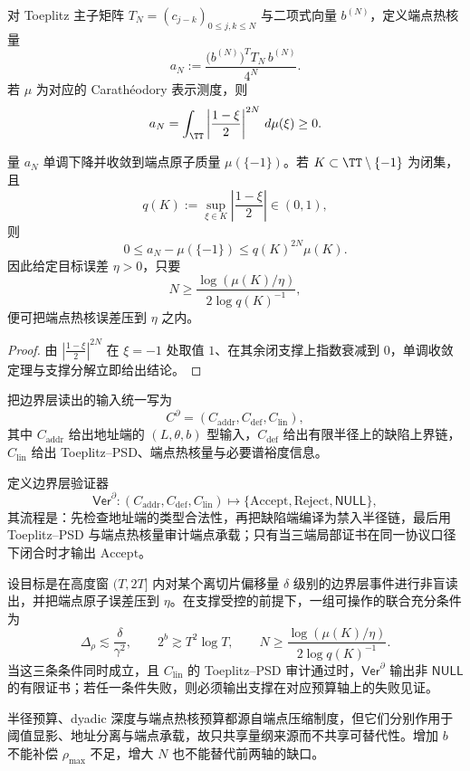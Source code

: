 \begin{definition}[端点热核量]\label{def:unit-circle-boundary-endpoint-heat}
对 Toeplitz 主子矩阵 \(T_N=(c_{j-k})_{0\le j,k\le N}\) 与二项式向量 \(b^{(N)}\)，定义端点热核量
\[
a_N:=\frac{\bigl(b^{(N)}\bigr)^{\!T}T_N\,b^{(N)}}{4^N}.
\]
若 \(\mu\) 为对应的 Carath\'eodory 表示测度，则
\[
a_N=\int_{\TT}\left|\frac{1-\xi}{2}\right|^{2N}\,d\mu(\xi)\ge 0.
\]
\end{definition}

\begin{proposition}[端点热核的单调极限]\label{prop:unit-circle-boundary-endpoint-heat-decay}
量 \(a_N\) 单调下降并收敛到端点原子质量 \(\mu(\{-1\})\)。若 \(K\subset\TT\setminus\{-1\}\) 为闭集，且
\[
q(K):=\sup_{\xi\in K}\left|\frac{1-\xi}{2}\right|\in(0,1),
\]
则
\[
0\le a_N-\mu(\{-1\})\le q(K)^{2N}\mu(K).
\]
因此给定目标误差 \(\eta>0\)，只要
\[
N\ge \frac{\log(\mu(K)/\eta)}{2\log q(K)^{-1}},
\]
便可把端点热核误差压到 \(\eta\) 之内。
\end{proposition}
\begin{proof}
由 \(\left|\frac{1-\xi}{2}\right|^{2N}\) 在 \(\xi=-1\) 处取值 \(1\)、在其余闭支撑上指数衰减到 \(0\)，单调收敛定理与支撑分解立即给出结论。
\end{proof}

\begin{definition}[三端证书对象]\label{def:unit-circle-boundary-triple-certificate}
把边界层读出的输入统一写为
\[
C^\partial=(C_{\mathrm{addr}},C_{\mathrm{def}},C_{\mathrm{lin}}),
\]
其中 \(C_{\mathrm{addr}}\) 给出地址端的 \((L,\theta,b)\) 型输入，\(C_{\mathrm{def}}\) 给出有限半径上的缺陷上界链，\(C_{\mathrm{lin}}\) 给出 Toeplitz--PSD、端点热核量与必要谱裕度信息。
\end{definition}

\begin{definition}[统一离线验证器]\label{def:unit-circle-boundary-verifier}
定义边界层验证器
\[
\mathsf{Ver}^{\partial}:
(C_{\mathrm{addr}},C_{\mathrm{def}},C_{\mathrm{lin}})
\longmapsto
\{\mathrm{Accept},\mathrm{Reject},\mathsf{NULL}\},
\]
其流程是：先检查地址端的类型合法性，再把缺陷端编译为禁入半径链，最后用 Toeplitz--PSD 与端点热核量审计端点承载；只有当三端局部证书在同一协议口径下闭合时才输出 \(\mathrm{Accept}\)。
\end{definition}

\begin{theorem}[三端预算的联合充分条件]\label{thm:unit-circle-boundary-joint-sufficiency}
设目标是在高度窗 \((T,2T]\) 内对某个离切片偏移量 \(\delta\) 级别的边界层事件进行非盲读出，并把端点原子误差压到 \(\eta\)。在支撑受控的前提下，一组可操作的联合充分条件为
\[
\Delta_\rho\lesssim \frac{\delta}{\gamma^2},
\qquad
2^b\gtrsim T^2\log T,
\qquad
N\ge \frac{\log(\mu(K)/\eta)}{2\log q(K)^{-1}}.
\]
当这三条条件同时成立，且 \(C_{\mathrm{lin}}\) 的 Toeplitz--PSD 审计通过时，\(\mathsf{Ver}^{\partial}\) 输出非 \(\mathsf{NULL}\) 的有限证书；若任一条件失败，则必须输出支撑在对应预算轴上的失败见证。
\end{theorem}

\begin{remark}[预算共享量纲而不共享可替代性]\label{rem:unit-circle-boundary-budget-nonsubstitutable}
半径预算、dyadic 深度与端点热核预算都源自端点压缩制度，但它们分别作用于阈值显影、地址分离与端点承载，故只共享量纲来源而不共享可替代性。增加 \(b\) 不能补偿 \(\rho_{\max}\) 不足，增大 \(N\) 也不能替代前两轴的缺口。
\end{remark}

